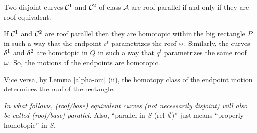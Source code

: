 \begin{lem}
     Two disjoint curves ${\cal C}^1$ and ${\cal C}^2$ of class ${\cal A}$ are roof parallel if and only if they are roof equivalent.  
\end{lem}

\begin{pf}
   If ${\cal C}^1$ and ${\cal C}^2$ are roof parallel then they are homotopic within the big rectangle $P$ in such a way
that the endpoint $e^t$ parametrizes the roof ${\omega}$. Similarly, the curves ${\delta}^1$ and ${\delta}^2$ are homotopic 
in $Q$ in such a way that $q^t$ parametrizes the same roof ${\omega}$. So, the motions of the endpoints are homotopic.

Vice versa, by Lemma \ref{alpha-om} (ii), the homotopy class of the endpoint motion  determines the roof of the
rectangle.  
 \end{pf}

{\it In what follows, (roof/base) equivalent curves (not necessarily disjoint) will also be called (roof/base) parallel.} 
Also, ``parallel in $S$ (rel~$\emptyset$)'' just means  ``properly homotopic'' in $S$.

